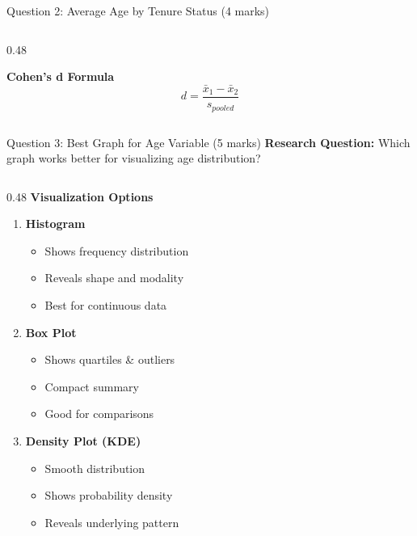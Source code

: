 \documentclass[aspectratio=169]{beamer}
\begin{document}
\begin{frame}{Question 2: Average Age by Tenure Status (4 marks)}
\begin{columns}[T]
\begin{column}{0.48\textwidth}
            \vspace{0.3cm}

            \textbf{Cohen's d Formula}
            \[
            d = \frac{\bar{x}_1 - \bar{x}_2}{s_{pooled}}
            \]
        \end{column}
    \end{columns}
\end{frame}

\begin{frame}{Question 3: Best Graph for Age Variable (5 marks)}
    \textbf{Research Question:} Which graph works better for visualizing age distribution?

    \vspace{0.3cm}

    \begin{columns}[T]
        \begin{column}{0.48\textwidth}
            \textbf{Visualization Options}

            \begin{enumerate}
                \item \textbf{Histogram}
                    \begin{itemize}
                        \item Shows frequency distribution
                        \item Reveals shape and modality
                        \item Best for continuous data
                    \end{itemize}

                \vspace{0.2cm}

                \item \textbf{Box Plot}
                    \begin{itemize}
                        \item Shows quartiles \& outliers
                        \item Compact summary
                        \item Good for comparisons
                    \end{itemize}

                \vspace{0.2cm}

                \item \textbf{Density Plot (KDE)}
                    \begin{itemize}
                        \item Smooth distribution
                        \item Shows probability density
                        \item Reveals underlying pattern
                    \end{itemize}
            \end{enumerate}
        \end{column}


\end{columns}
\end{frame}
\end{document}
